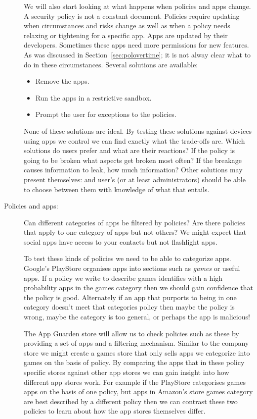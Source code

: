 \documentclass[a4paper]{article}
\begin{document}
\begin{description}
    We will also start looking at what happens when policies and apps change.  A security
    policy is not a constant document.  Policies require updating when
    circumstances and risks change as well as when a policy needs relaxing or
    tightening for a specific app. Apps are updated by their developers.
    Sometimes these apps need more permissions for new features.  As was discussed in
    Section~\ref{sec:polovertime}; it is not alway clear what to do in these
    circumstances. Several solutions are available:

    \begin{itemize}
      \item Remove the apps.
      \item Run the apps in a restrictive sandbox.
      \item Prompt the user for exceptions to the policies.
    \end{itemize}

    None of these solutions are ideal. By testing these solutions against
    devices using apps we control we can find exactly what the trade-offs are.
    Which solutions do users prefer and what are their reactions?  If the policy
    is going to be broken what aspects get broken most often?  If the breakage
    causes information to leak, how much information?  Other solutions may
    present themselves: and user's (or at least administrators) should be able
    to choose between them with knowledge of what that entails.
    
  \item[Policies and apps:] Can different categories of apps be filtered by
    policies?  Are there policies that apply to one category of apps but not
    others?  We might expect that social apps have access to your contacts but
    not flashlight apps.
  
    To test these kinds of policies we need to be able to categorize apps.
    Google's PlayStore organises apps into sections such as \emph{games} or
    useful apps.  If a policy we write to describe games identifies with a high
    probability apps in the games category then we should gain confidence that
    the policy is good.  Alternately if an app that purports to being in one
    category doesn't meet that categories policy then maybe the policy is wrong,
    maybe the category is too general, or perhaps the app is malicious!

    The App Guarden store will allow us to check policies such as these by
    providing a set of apps and a filtering mechanism.  Similar to the company
    store we might create a games store that only sells apps we categorize into
    games on the basis of policy.  By comparing the apps that in these policy
    specific stores against other app stores we can gain insight into how
    different app stores work.  For example if the PlayStore categorises games
    apps on the basis of one policy, but apps in Amazon's store games category
    are best described by a different policy then we can contrast these two
    policies to learn about how the app stores themselves differ.


\end{description}
\end{document}
